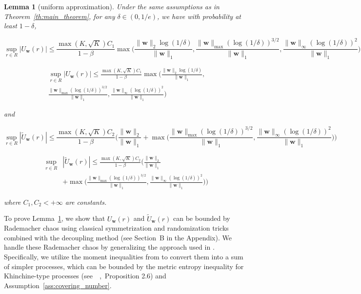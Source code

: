 \documentclass[letterpaper]{article} %
\def\DoubleColumn{}
\def\DoubleColumnEnd{}
\def\SingleColumn{}
\def\SingleColumnEnd{}
\newtheorem{lemma}{Lemma}
\newcommand{\weight}{\mathbf{w}}
\newcommand{\normo}[1]{\|#1\|_1}
\newcommand{\complexbound}{\beta}
\newcommand{\citep}[3]{(#1\ \citeauthor{#3}\ \citeyear{#3},\ #2)}
\begin{document}
\begin{lemma}[uniform approximation]
    \label{le:uniform_approximation}
    Under the same assumptions as in Theorem~\ref{th:main_theorem}, for any $\delta\in (0,1/e)$, we have with probability at least $1-\delta$,
    \SingleColumn
    \[\sup_{r\in R}|U_\weight{}(r)|\le \frac{\max(K,\sqrt{K})C_1}{1-\complexbound{}}\max\Big(\frac{\|\weight{}\|_2\log(1/\delta)}{\normo{\weight{}}},\frac{\|\weight{}\|_{\max}(\log(1/\delta))^{3/2}}{\normo{\weight{}}}, \frac{\|\weight{}\|_\infty(\log(1/\delta))^2}{\normo{\weight{}}}\Big)\]
    \SingleColumnEnd
    \DoubleColumn
    \begin{align*}
        \sup_{r\in R}|U_\weight{}(r)|\le \frac{\max(K,\sqrt{K})C_1}{1-\complexbound{}}\max\Big(\frac{\|\weight{}\|_2\log(1/\delta)}{\normo{\weight{}}},\\
        \frac{\|\weight{}\|_{\max}(\log(1/\delta))^{3/2}}{\normo{\weight{}}}, \frac{\|\weight{}\|_\infty(\log(1/\delta))^2}{\normo{\weight{}}}\Big)
    \end{align*}
    \DoubleColumnEnd
    and
    \SingleColumn
    \[\sup_{r\in R}|\widetilde{U}_\weight{}(r)|\le \frac{\max(K,\sqrt{K})C_2}{1-\complexbound{}}\Bigg(\frac{\|\weight{}\|_2}{\normo{\weight{}}}+\max\Big(\frac{\|\weight{}\|_{\max}(\log(1/\delta))^{3/2}}{\normo{\weight{}}},\frac{\|\weight{}\|_\infty(\log(1/\delta))^2}{\normo{\weight{}}}\Big)\Bigg)\]
    \SingleColumnEnd
    \DoubleColumn
    \begin{align*}
        \sup_{r\in R}&|\widetilde{U}_\weight{}(r)|\le \frac{\max(K,\sqrt{K})C_2}{1-\complexbound{}}\Bigg(\frac{\|\weight{}\|_2}{\normo{\weight{}}}\\
        &+\max\Big(\frac{\|\weight{}\|_{\max}(\log(1/\delta))^{3/2}}{\normo{\weight{}}},\frac{\|\weight{}\|_\infty(\log(1/\delta))^2}{\normo{\weight{}}}\Big)\Bigg)
    \end{align*}
    \DoubleColumnEnd
    where $C_1,C_2 < +\infty$ are constants.
\end{lemma}

To prove Lemma~\ref{le:uniform_approximation}, we show that $U_\weight{}(r)$ and $\widetilde{U}_\weight{}(r)$ can be bounded by Rademacher chaos using classical symmetrization and randomization tricks combined with the decoupling method (see Section~B in the Appendix). We handle these Rademacher chaos by generalizing the approach used in \cite{clemenccon2008ranking}. 
Specifically, we utilize the moment inequalities from \cite{Boucheron2005} to convert them into a sum of simpler processes, which can be bounded by the metric entropy inequality for Khinchine-type processes \citep{see}{Proposition 2.6}{Dembo1994} and Assumption~\ref{ass:covering_number}.
\end{document}
